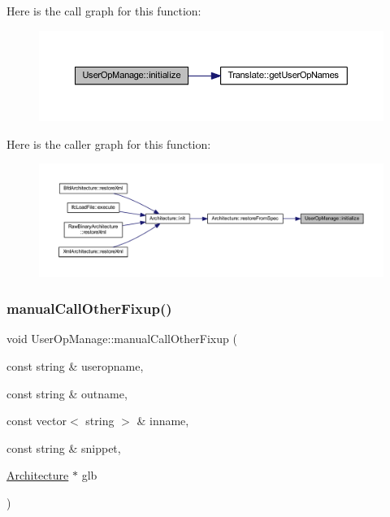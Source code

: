 Here is the call graph for this function\+:
\nopagebreak
\begin{figure}[H]
\begin{center}
\leavevmode
\includegraphics[width=350pt]{class_user_op_manage_a3a4220cee8c82eb2a30b527bb952a4d6_cgraph}
\end{center}
\end{figure}
Here is the caller graph for this function\+:
\nopagebreak
\begin{figure}[H]
\begin{center}
\leavevmode
\includegraphics[width=350pt]{class_user_op_manage_a3a4220cee8c82eb2a30b527bb952a4d6_icgraph}
\end{center}
\end{figure}
\mbox{\label{class_user_op_manage_aa18eec5842807b13c5ad174377fc14f0}} 
\subsubsection{\texorpdfstring{manualCallOtherFixup()}{manualCallOtherFixup()}}
{\footnotesize\ttfamily void User\+Op\+Manage\+::manual\+Call\+Other\+Fixup (\begin{DoxyParamCaption}\item[{const string \&}]{useropname,  }\item[{const string \&}]{outname,  }\item[{const vector$<$ string $>$ \&}]{inname,  }\item[{const string \&}]{snippet,  }\item[{\mbox{\hyperlink{class_architecture}{Architecture}} $\ast$}]{glb }\end{DoxyParamCaption})}



